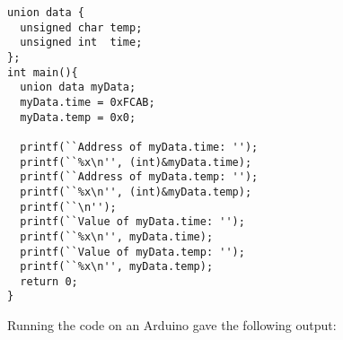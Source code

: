 \documentclass{hw}
\begin{document}
\begin{lstlisting}
union data {
  unsigned char temp;
  unsigned int  time;
};
int main(){
  union data myData;
  myData.time = 0xFCAB;
  myData.temp = 0x0;

  printf(``Address of myData.time: '');
  printf(``%x\n'', (int)&myData.time);
  printf(``Address of myData.temp: '');
  printf(``%x\n'', (int)&myData.temp);
  printf(``\n'');
  printf(``Value of myData.time: '');
  printf(``%x\n'', myData.time);
  printf(``Value of myData.temp: '');
  printf(``%x\n'', myData.temp);
  return 0;
}
\end{lstlisting}

Running the code on an Arduino gave the following output:
\end{document}
